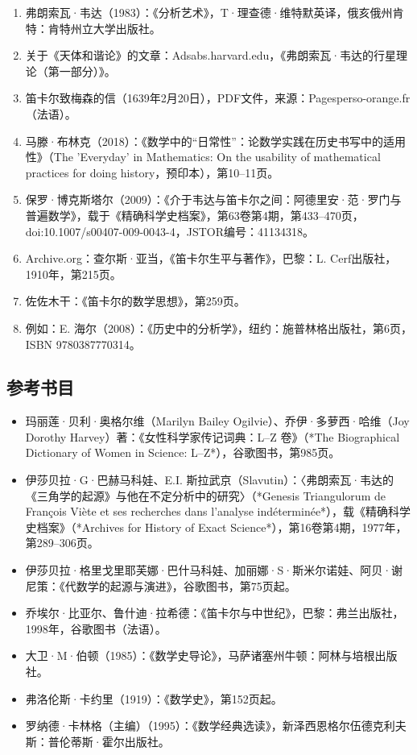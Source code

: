 \begin{enumerate}
\item 弗朗索瓦·韦达（1983）：《分析艺术》，T·理查德·维特默英译，俄亥俄州肯特：肯特州立大学出版社。
\item 关于《天体和谐论》的文章：Adsabs.harvard.edu，《弗朗索瓦·韦达的行星理论（第一部分）》。
\item 笛卡尔致梅森的信（1639年2月20日），PDF文件，来源：Pagesperso-orange.fr（法语）。
\item 马滕·布林克（2018）：《数学中的“日常性”：论数学实践在历史书写中的适用性》（The 'Everyday' in Mathematics: On the usability of mathematical practices for doing history，预印本），第10–11页。
\item 保罗·博克斯塔尔（2009）：《介于韦达与笛卡尔之间：阿德里安·范·罗门与普遍数学》，载于《精确科学史档案》，第63卷第4期，第433–470页，doi:10.1007/s00407-009-0043-4，JSTOR编号：41134318。
\item Archive.org：查尔斯·亚当，《笛卡尔生平与著作》，巴黎：L. Cerf出版社，1910年，第215页。
\item 佐佐木干：《笛卡尔的数学思想》，第259页。
\item 例如：E. 海尔（2008）：《历史中的分析学》，纽约：施普林格出版社，第6页，ISBN 9780387770314。
\end{enumerate}
\subsection{参考书目}

\begin{itemize}
\item 玛丽莲·贝利·奥格尔维（Marilyn Bailey Ogilvie）、乔伊·多萝西·哈维（Joy Dorothy Harvey）著：《女性科学家传记词典：L–Z 卷》（*The Biographical Dictionary of Women in Science: L–Z*），谷歌图书，第985页。

\item 伊莎贝拉·G·巴赫马科娃、E.I. 斯拉武京（Slavutin）：〈弗朗索瓦·韦达的《三角学的起源》与他在不定分析中的研究〉（*Genesis Triangulorum de François Viète et ses recherches dans l’analyse indéterminée*），载《精确科学史档案》（*Archives for History of Exact Science*），第16卷第4期，1977年，第289–306页。
\item 伊莎贝拉·格里戈里耶芙娜·巴什马科娃、加丽娜·S·斯米尔诺娃、阿贝·谢尼策：《代数学的起源与演进》，谷歌图书，第75页起。
\item 乔埃尔·比亚尔、鲁什迪·拉希德：《笛卡尔与中世纪》，巴黎：弗兰出版社，1998年，谷歌图书（法语）。
\item 大卫·M·伯顿（1985）：《数学史导论》，马萨诸塞州牛顿：阿林与培根出版社。
\item 弗洛伦斯·卡约里（1919）：《数学史》，第152页起。
\item 罗纳德·卡林格（主编）（1995）：《数学经典选读》，新泽西恩格尔伍德克利夫斯：普伦蒂斯·霍尔出版社。

\end{itemize}
